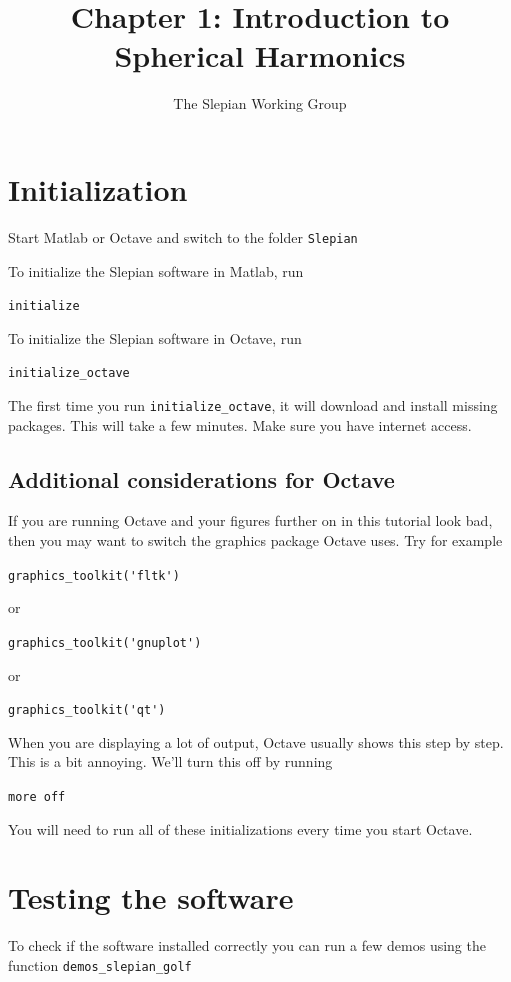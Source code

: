 \documentclass[11pt]{article}
\title{Chapter 1: Introduction to Spherical Harmonics}
\author{The Slepian Working Group}
\begin{document}
\maketitle

\section{Initialization}

Start Matlab or Octave and switch to the folder \verb+Slepian+

To initialize the Slepian software in Matlab, run

\qquad \verb+initialize+

To initialize the Slepian software in Octave, run

\qquad \verb+initialize_octave+

The first time you run \verb+initialize_octave+, it will download and install
missing packages. This will take a few minutes. Make sure you have
internet access. 

\subsection{Additional considerations for Octave}

If you are running Octave and your figures further on in this tutorial
look bad, then you may want to switch the graphics package Octave
uses. Try for example

\qquad \verb+graphics_toolkit('fltk')+

or

\qquad \verb+graphics_toolkit('gnuplot')+

or

\qquad \verb+graphics_toolkit('qt')+

When you are displaying a lot of output, Octave usually shows this
step by step. This is a bit annoying. We'll turn this off by running

\qquad \verb+more off+

You will need to run all of these initializations every time you start
Octave.



\section{Testing the software}\label{testing}
To check if the software installed correctly you can run a few demos
using the function \verb+demos_slepian_golf+
\end{document}
